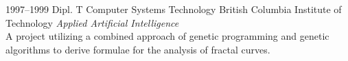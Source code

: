 \documentclass[]{friggeri-cv} %
\begin{document}
\begin{entrylist}
\entry
{1997--1999}
{Dipl. T {\normalfont Computer Systems Technology}}
{British Columbia Institute of Technology}
{\emph{Applied Artificial Intelligence} \\ A project utilizing a combined approach of genetic programming and genetic algorithms to derive formulae for the analysis of fractal curves.}
\end{entrylist}







\end{document}
